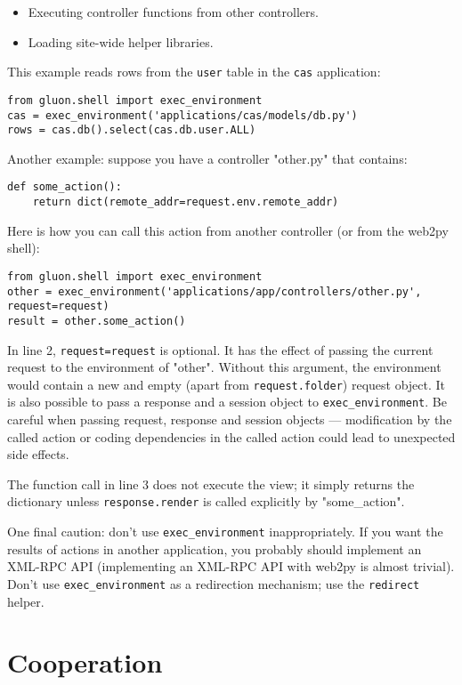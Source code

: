 \documentclass[justified,sixbynine,notoc]{tufte-book}
\def\ft{\small\tt}
\begin{document}
\begin{fullwidth}
\begin{itemize}
\item Executing controller functions from other controllers.

\item Loading site-wide helper libraries.
\end{itemize}

This example reads rows from the {\ft user} table in the {\ft cas} application:
\begin{lstlisting}
from gluon.shell import exec_environment
cas = exec_environment('applications/cas/models/db.py')
rows = cas.db().select(cas.db.user.ALL)
\end{lstlisting}

Another example: suppose you have a controller "other.py" that contains:
\begin{lstlisting}
def some_action():
    return dict(remote_addr=request.env.remote_addr)
\end{lstlisting}

Here is how you can call this action from another controller (or from the web2py shell):
\begin{lstlisting}
from gluon.shell import exec_environment
other = exec_environment('applications/app/controllers/other.py', request=request)
result = other.some_action()
\end{lstlisting}

In line 2, {\ft request=request} is optional. It has the effect of passing the current request to the environment of "other". Without this argument, the environment would contain a new and empty (apart from {\ft request.folder}) request object. It is also possible to pass a response and a session object to {\ft exec\_environment}. Be careful when passing request, response and session objects --- modification by the called action or coding dependencies in the called action could lead to unexpected side effects.

The function call in line 3 does not execute the view; it simply returns the dictionary unless {\ft response.render} is called explicitly by "some\_action".

One final caution: don't use {\ft exec\_environment} inappropriately. If you want the results of actions in another application, you probably should implement an XML-RPC API (implementing an XML-RPC API with web2py is almost trivial). Don't use {\ft exec\_environment} as a redirection mechanism; use the {\ft redirect} helper.

\goodbreak\section{Cooperation}


\end{fullwidth}
\end{document}
